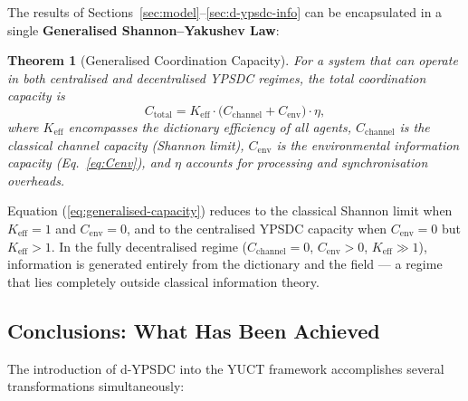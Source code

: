 \documentclass[12pt,a4paper]{article}
\newtheorem{theorem}{Theorem}[section]
\theoremstyle{remark}
\begin{document}
	The results of Sections~\ref{sec:model}--\ref{sec:d-ypsdc-info} can be
	encapsulated in a single \textbf{Generalised Shannon--Yakushev Law}:
	
	\begin{theorem}[Generalised Coordination Capacity]
		For a system that can operate in both centralised and decentralised YPSDC
		regimes, the total coordination capacity is
		\begin{equation}
			\boxed{C_{\mathrm{total}} = K_{\mathrm{eff}} \cdot \bigl(
				C_{\mathrm{channel}} + C_{\mathrm{env}} \bigr) \cdot \eta},
			\label{eq:generalised-capacity}
		\end{equation}
		where $K_{\mathrm{eff}}$ encompasses the dictionary efficiency of all agents,
		$C_{\mathrm{channel}}$ is the classical channel capacity (Shannon limit),
		$C_{\mathrm{env}}$ is the environmental information capacity
		(Eq.\ \eqref{eq:Cenv}), and $\eta$ accounts for processing and synchronisation
		overheads.
	\end{theorem}
	
	Equation (\ref{eq:generalised-capacity}) reduces to the classical Shannon limit
	when $K_{\mathrm{eff}}=1$ and $C_{\mathrm{env}}=0$, and to the centralised YPSDC
	capacity when $C_{\mathrm{env}}=0$ but $K_{\mathrm{eff}}>1$. In the fully
	decentralised regime ($C_{\mathrm{channel}}=0$, $C_{\mathrm{env}}>0$,
	$K_{\mathrm{eff}}\gg1$), information is generated entirely from the dictionary
	and the field --- a regime that lies completely outside classical information
	theory.
	
	\subsection{Conclusions: What Has Been Achieved}
	\label{subsec:conclusions-dypsdc}
	
	The introduction of d-YPSDC into the YUCT framework accomplishes several
	transformations simultaneously:
	
\end{document}
